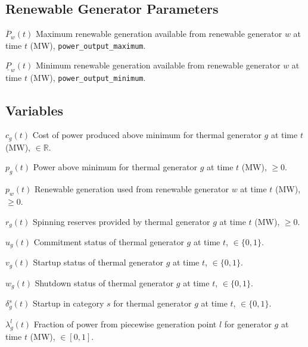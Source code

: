 \documentclass{article}
\newcommand{\cG}{{\mathcal G}}
\newcommand{\bbR}{{\mathbb R}}
\newcommand{\uP}{\underline{P}}
\newcommand{\oP}{\overline{P}}
\newcommand\mydescriptionopt{
	\IEEEsetlabelwidth{$g \in \cG_{\textit{off}}^0$]}
	\IEEEusemathlabelsep
}
\begin{document}
\subsection{Renewable Generator Parameters}
\begin{IEEEdescription}[\mydescriptionopt]
	\item[$\oP_w(t)$] Maximum renewable generation available from renewable generator $w$ at time $t$ (MW), {\tt power\_output\_maximum}.
	\item[$\uP_w(t)$] Minimum renewable generation available from renewable generator $w$ at time $t$ (MW), {\tt power\_output\_minimum}.
\end{IEEEdescription}


\subsection{Variables}
\begin{IEEEdescription}[\mydescriptionopt]
	\item[$c_g(t)$]    Cost of power produced above minimum for thermal generator $g$ at time $t$ (MW), $\in \bbR$.
	\item[$p_g(t)$]    Power above minimum for thermal generator $g$ at time $t$ (MW), $\geq 0$.
	\item[$p_w(t)$]  Renewable generation used from renewable generator $w$ at time $t$ (MW), $\geq 0$.
	\item[$r_g(t)$]    Spinning reserves provided by thermal generator $g$ at time $t$ (MW), $\geq 0$.
	\item[$u_g(t)$]    Commitment status of thermal generator $g$ at time $t$, $\in \{0,1\}$. 
	\item[$v_g(t)$]    Startup status of thermal generator $g$ at time $t$, $\in \{0,1\}$. 
	\item[$w_g(t)$]    Shutdown status of thermal generator $g$ at time $t$, $\in \{0,1\}$. \
	\item[$\delta^s_g(t)$] Startup in category $s$ for thermal generator $g$ at time $t$, $\in \{0,1\}$.
	\item[$\lambda_g^l(t)$]  Fraction of power from piecewise generation point $l$ for generator $g$ at time $t$ (MW), $\in [0,1]$.
\
\end{IEEEdescription}
\end{document}

